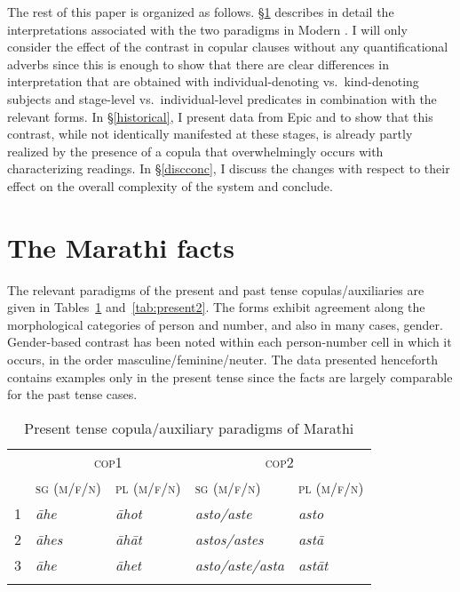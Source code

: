 \documentclass[output=paper,hidelinks]{langscibook}
\begin{document}
The rest of this paper is organized as follows. \S\ref{data} describes in detail the interpretations associated with the two paradigms in Modern . I will only consider the effect of the contrast in copular clauses without any quantificational adverbs since this is enough to show that there are clear differences in interpretation that are obtained with individual-denoting vs.\ kind-denoting subjects and stage-level vs.\ individual-level predicates in combination with the relevant forms. In \S\ref{historical}, I present data from Epic  and  to show that this contrast, while not identically manifested at these stages, is already partly realized by the presence of a copula that overwhelmingly occurs with characterizing readings. In \S\ref{discconc}, I discuss the changes with respect to their effect on the overall complexity of the system and conclude.


 \section{The Marathi facts}\label{data}
The relevant paradigms of the present and past tense copulas/auxiliaries are given in Tables~\ref{tab:present} and~\ref{tab:present2}. The forms exhibit agreement along the morphological categories of person and number, and also in many cases, gender. Gender-based contrast has been noted within each person-number cell in which it occurs, in the order masculine/feminine/neuter. The data presented henceforth contains examples only in the present tense since the facts are largely comparable for the past tense cases.

\begin{table}
\caption{Present tense copula/auxiliary paradigms of Marathi\label{tab:present}}
\begin{tabular}{lllll}
\lsptoprule
& \multicolumn{2}{c}{\textsc{cop1}} & \multicolumn{2}{c}{\textsc{cop2}}\\
 \cmidrule(lr){2-3}\cmidrule(lr){4-5}
 & \textsc{sg (m/f/n)} & \textsc{pl (m/f/n)} & \textsc{sg (m/f/n)} & \textsc{pl (m/f/n)}\\
 \midrule
1 & \emph{āhe} & \emph{āhot} & \emph{asto/aste} & \emph{asto}\\
2 & \emph{āhes} & \emph{āhāt} & \emph{astos/astes} & \emph{astā}\\
3 & \emph{āhe} & \emph{āhet} & \emph{asto/aste/asta} & \emph{astāt}\\
\lspbottomrule
\end{tabular} 
\end{table}
\end{document}
